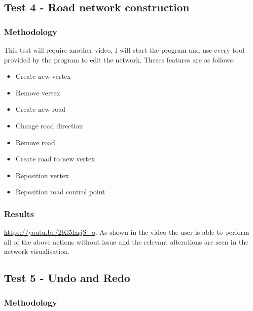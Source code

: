     \subsection{Test 4 - Road network construction}
    \label{testing:t4}

        \subsubsection{Methodology}

            This test will require another video, I will start the program and use every tool provided by the program to edit the network. Theses features are as follows:

            \begin{itemize}
                \item Create new vertex
                \item Remove vertex
                \item Create new road
                \item Change road direction
                \item Remove road
                \item Create road to new vertex
                \item Reposition vertex
                \item Reposition road control point
            \end{itemize}

        \subsubsection{Results}

            \href{https://youtu.be/2Kl5lxrjS\_o}{https://youtu.be/2Kl5lxrjS\_o}. As shown in the video the user is able to perform all of the above actions without issue and the relevant alterations are seen in the network visualisation.

    \subsection{Test 5 - Undo and Redo}
    \label{testing:t5}

        \subsubsection{Methodology}

